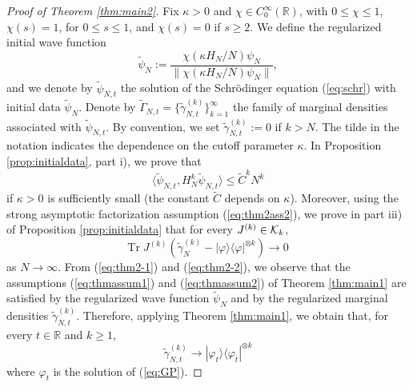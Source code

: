 \documentclass[11pt]{article}
\newcommand{\ph}{\varphi}
\newcommand{\bR}{{\mathbb R}}
\newcommand{\tr}{\mbox{Tr}}
\newcommand{\wt}{\widetilde}
\newcommand{\cK}{{\cal K}}
\begin{document}
\begin{proof}[Proof of Theorem \ref{thm:main2}]

Fix $\kappa >0$ and $\chi \in C_0^{\infty} (\bR)$, with $0\leq
\chi\leq 1$, $\chi (s) = 1$, for $0 \leq s \leq 1$, and $\chi (s)
=0$ if $s \geq 2$. We define the regularized initial wave function
\[
\wt \psi_N := \frac{ \chi (\kappa H_N /N) \psi_N }{ \| \chi (\kappa
H_N /N) \psi_N \|} ,
\]
and  we denote by $\wt\psi_{N,t}$ the solution of the Schr\"odinger
equation (\ref{eq:schr}) with initial data $\wt \psi_N$. Denote by
$\wt \Gamma_{N,t} = \{ \wt \gamma_{N,t}^{(k)} \}_{k=1}^\infty$ the
family of marginal densities associated with $\wt \psi_{N,t}$. By
convention, we set $\wt\gamma^{(k)}_{N,t}:=0$ if $k >N$. The tilde
in the notation indicates the dependence on the cutoff parameter
$\kappa$. In Proposition \ref{prop:initialdata}, part i), we prove
that
\begin{equation}\label{eq:thm2-1}
\langle \wt \psi_{N,t} , H_N^k \wt\psi_{N,t} \rangle \leq {\wt C}^k
N^k \end{equation} if $\kappa >0$ is sufficiently small (the
constant $\wt C$ depends on $\kappa$). Moreover, using the strong
asymptotic factorization assumption (\ref{eq:thm2ass2}), we prove in
part iii) of Proposition \ref{prop:initialdata} that for every
$J^{(k)} \in \cK_k$,
\begin{equation}\label{eq:thm2-2}
\tr \; J^{(k)} \left( \wt \gamma_N^{(k)} - |\ph \rangle \langle
\ph|^{\otimes k} \right) \to 0
\end{equation}
as $N \to \infty$. {F}rom (\ref{eq:thm2-1}) and (\ref{eq:thm2-2}),
we observe that the assumptions (\ref{eq:thmassum1}) and
(\ref{eq:thmassum2}) of Theorem \ref{thm:main1} are satisfied by the
regularized wave function $\wt \psi_N$ and by the regularized
marginal densities $\wt \gamma^{(k)}_{N,t}$. Therefore, applying
Theorem \ref{thm:main1}, we obtain that, for every $t \in \bR$ and
$k \geq 1$,
\begin{equation}\label{eq:conve} \wt \gamma_{N,t}^{(k)} \to |\ph_t \rangle \langle
\ph_t|^{\otimes k} \end{equation} where $\ph_t$ is the solution of
(\ref{eq:GP}).

\medskip


\end{proof}
\end{document}
